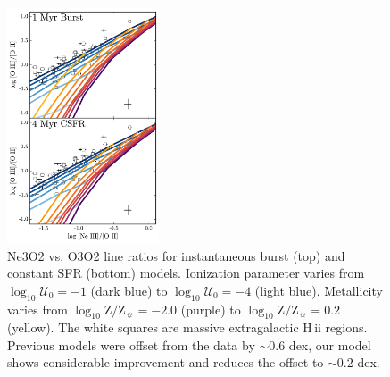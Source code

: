 \documentclass[twocolumn, tighten]{aastex61}
\newcommand{\logten}{\ensuremath{\log_{10}}}
\newcommand{\hii}{H\,{\sc ii}\xspace}
\newcommand{\logZeq}[1]{\ensuremath{\logten \mathrm{Z}/\mathrm{Z}_{\sun} = #1}}
\newcommand{\logU}{\ensuremath{\logten \mathcal{U}_0}}
\begin{document}
\begin{figure}
  \begin{centering}
    \includegraphics[width=0.4\textwidth]{f19.pdf}
    \caption{Ne3O2 vs. O3O2 line ratios for instantaneous burst (top) and constant SFR (bottom) models. Ionization parameter varies from $\logU{}=-1$ (dark blue) to $\logU{}=-4$ (light blue). Metallicity varies from \logZeq{-2.0} (purple) to \logZeq{0.2} (yellow). The white squares are massive extragalactic \hii regions. Previous models were offset from the data by $\sim 0.6$ dex, our model shows considerable improvement and reduces the offset to $\sim 0.2$ dex.}
    \label{fig:NeIII}
  \end{centering}
\end{figure}
\end{document}
